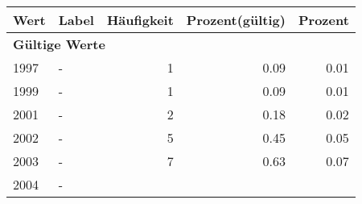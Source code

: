      \begin{longtable}{lXrrr}
     \toprule
     \textbf{Wert} & \textbf{Label} & \textbf{Häufigkeit} & \textbf{Prozent(gültig)} & \textbf{Prozent} \\
     \endhead
     \midrule
     \multicolumn{5}{l}{\textbf{Gültige Werte}}\\

     1997 &
     \multicolumn{1}{X}{ -  } &


       \num{1} &
       \num[round-mode=places,round-precision=2]{0,09} &
         \num[round-mode=places,round-precision=2]{0,01} \\

     1999 &
     \multicolumn{1}{X}{ -  } &


       \num{1} &
       \num[round-mode=places,round-precision=2]{0,09} &
         \num[round-mode=places,round-precision=2]{0,01} \\

     2001 &
     \multicolumn{1}{X}{ -  } &


       \num{2} &
       \num[round-mode=places,round-precision=2]{0,18} &
         \num[round-mode=places,round-precision=2]{0,02} \\

     2002 &
     \multicolumn{1}{X}{ -  } &


       \num{5} &
       \num[round-mode=places,round-precision=2]{0,45} &
         \num[round-mode=places,round-precision=2]{0,05} \\

     2003 &
     \multicolumn{1}{X}{ -  } &


       \num{7} &
       \num[round-mode=places,round-precision=2]{0,63} &
         \num[round-mode=places,round-precision=2]{0,07} \\

     2004 &
     \multicolumn{1}{X}{ -  } &



\end{longtable}
